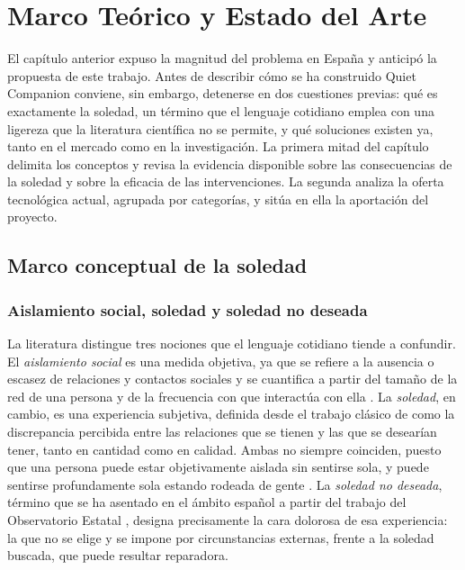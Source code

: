 \chapter{Marco Teórico y Estado del Arte}
\label{cap:marco-teorico}

El capítulo anterior expuso la magnitud del problema en España y anticipó la propuesta de este trabajo. Antes
de describir cómo se ha construido Quiet Companion conviene, sin embargo, detenerse en dos cuestiones previas:
qué es exactamente la soledad, un término que el lenguaje cotidiano emplea con una ligereza que la literatura
científica no se permite, y qué soluciones existen ya, tanto en el mercado como en la investigación. La
primera mitad del capítulo delimita los conceptos y revisa la evidencia disponible sobre las consecuencias de
la soledad y sobre la eficacia de las intervenciones. La segunda analiza la oferta tecnológica actual,
agrupada por categorías, y sitúa en ella la aportación del proyecto.

\section{Marco conceptual de la soledad}
\label{marco-conceptual}

\subsection{Aislamiento social, soledad y soledad no deseada}

La literatura distingue tres nociones que el lenguaje cotidiano tiende a confundir. El \textit{aislamiento social} es una medida objetiva, ya que se refiere a la ausencia o escasez de relaciones y contactos sociales y
se cuantifica a partir del tamaño de la red de una persona y de la frecuencia con que interactúa con ella
\citep{Courtin2017}. La \textit{soledad}, en cambio, es una experiencia subjetiva, definida desde el trabajo
clásico de \textcite{Perlman1981} como la discrepancia percibida entre las relaciones que se tienen y las que
se desearían tener, tanto en cantidad como en calidad. Ambas no siempre coinciden, puesto que una persona
puede estar objetivamente aislada sin sentirse sola, y puede sentirse profundamente sola estando rodeada de
gente \citep{Dykstra2009,Yanguas2018}. La \textit{soledad no deseada}, término que se ha asentado en el ámbito
español a partir del trabajo del Observatorio Estatal \citep{SoledadES,JimenezRodriguez2024}, designa
precisamente la cara dolorosa de esa experiencia: la que no se elige y se impone por circunstancias externas,
frente a la soledad buscada, que puede resultar reparadora.

